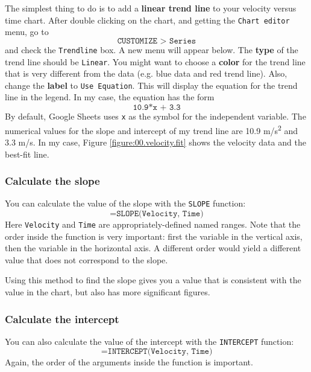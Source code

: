The simplest thing to do is to add a \textbf{linear trend line} to your velocity versus time chart. After double clicking on the chart, and getting the \texttt{Chart editor} menu, go to
\begin{equation}
    \texttt{CUSTOMIZE > Series}
\end{equation}
and check the \texttt{Trendline} box. A new menu will appear below. The \textbf{type} of the trend line should be \texttt{Linear}. You might want to choose a \textbf{color} for the trend line that is very different from the data (e.g. blue data and red trend line). Also, change the \textbf{label} to \texttt{Use Equation}. This will display the equation for the trend line in the legend. In my case, the equation has the form
\begin{equation}
    \texttt{10.9*x + 3.3}
\end{equation}
By default, Google Sheets uses \texttt{x} as the symbol for the independent variable. The numerical values for the slope and intercept of my trend line are 10.9 m/s\textsuperscript{2} and 3.3 m/s. In my case, Figure \ref{figure:00.velocity.fit} shows the velocity data and the best-fit line.
%
\subsubsection{Calculate the slope}
%
You can calculate the value of the slope with the \texttt{SLOPE} function:
\begin{equation}
    \texttt{=SLOPE(Velocity, Time)}
\end{equation}
Here \texttt{Velocity} and \texttt{Time} are appropriately-defined named ranges. Note that the order inside the function is very important: first the variable in the vertical axis, then the variable in the horizontal axis. A different order would yield a different value that does not correspond to the slope.

Using this method to find the slope gives you a value that is consistent with the value in the chart, but also has more significant figures.
%
\subsubsection{Calculate the intercept}
%
You can also calculate the value of the intercept with the \texttt{INTERCEPT} function:
\begin{equation}
    \texttt{=INTERCEPT(Velocity, Time)}
\end{equation}
Again, the order of the arguments inside the function is important.
%
